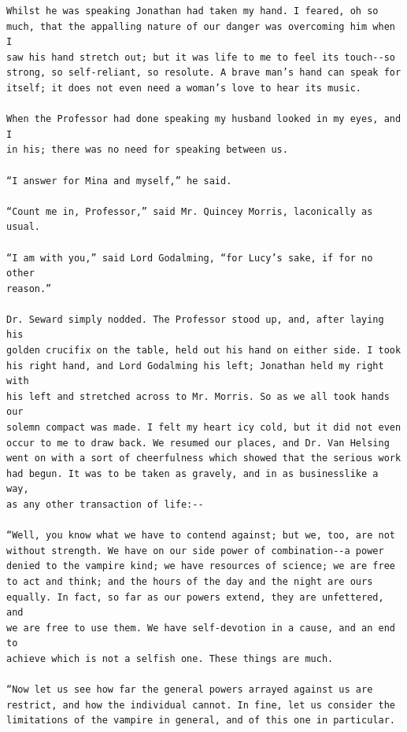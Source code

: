 \documentclass{article}
\begin{document}
\begin{verbatim}
Whilst he was speaking Jonathan had taken my hand. I feared, oh so
much, that the appalling nature of our danger was overcoming him when I
saw his hand stretch out; but it was life to me to feel its touch--so
strong, so self-reliant, so resolute. A brave man’s hand can speak for
itself; it does not even need a woman’s love to hear its music.

When the Professor had done speaking my husband looked in my eyes, and I
in his; there was no need for speaking between us.

“I answer for Mina and myself,” he said.

“Count me in, Professor,” said Mr. Quincey Morris, laconically as usual.

“I am with you,” said Lord Godalming, “for Lucy’s sake, if for no other
reason.”

Dr. Seward simply nodded. The Professor stood up, and, after laying his
golden crucifix on the table, held out his hand on either side. I took
his right hand, and Lord Godalming his left; Jonathan held my right with
his left and stretched across to Mr. Morris. So as we all took hands our
solemn compact was made. I felt my heart icy cold, but it did not even
occur to me to draw back. We resumed our places, and Dr. Van Helsing
went on with a sort of cheerfulness which showed that the serious work
had begun. It was to be taken as gravely, and in as businesslike a way,
as any other transaction of life:--

“Well, you know what we have to contend against; but we, too, are not
without strength. We have on our side power of combination--a power
denied to the vampire kind; we have resources of science; we are free
to act and think; and the hours of the day and the night are ours
equally. In fact, so far as our powers extend, they are unfettered, and
we are free to use them. We have self-devotion in a cause, and an end to
achieve which is not a selfish one. These things are much.

“Now let us see how far the general powers arrayed against us are
restrict, and how the individual cannot. In fine, let us consider the
limitations of the vampire in general, and of this one in particular.


\end{verbatim}
\end{document}
